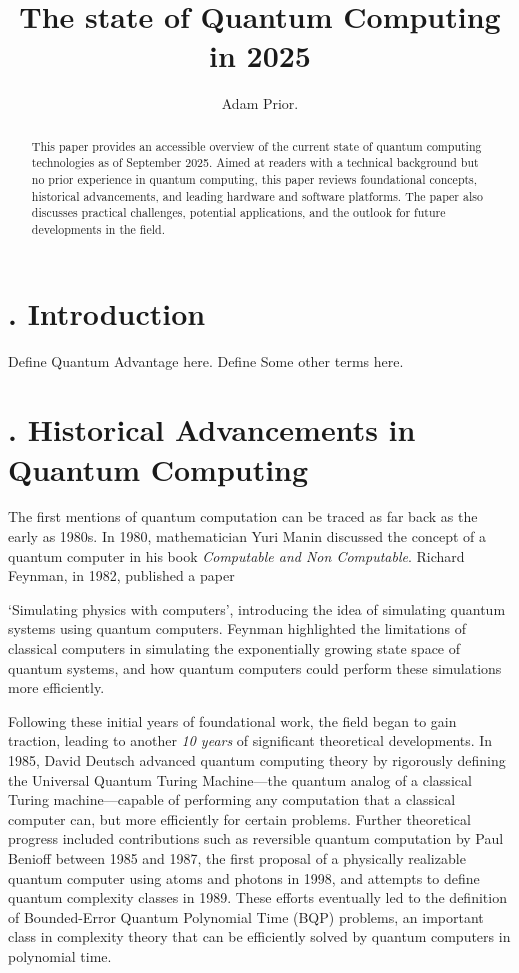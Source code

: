 \documentclass{elbioimp2}
\title{The state of Quantum Computing in 2025}
\author{Adam Prior.\affiliation{UrbanFox, Dublin, Ireland}}
\begin{document}
\setcounter{secnumdepth}{2}


\maketitle

\begin{abstract}
This paper provides an accessible overview of the current state of quantum computing technologies as of September 2025. Aimed at readers with a technical background but no prior experience in quantum computing, this paper reviews foundational concepts, historical advancements, and leading hardware and software platforms. The paper also discusses practical challenges, potential applications, and the outlook for future developments in the field.

\end{abstract}

\section{. Introduction}
Define Quantum Advantage here.
Define Some other terms here.


\section{. Historical Advancements in Quantum Computing}
The first mentions of quantum computation can be traced as far back as the early as 1980s.
In 1980, mathematician Yuri Manin discussed the concept of a quantum computer in his book \textit{Computable and Non Computable}\cite{Manin1980}. Richard Feynman, in 1982, published a paper

`Simulating physics with computers', introducing the idea of simulating quantum systems using quantum computers\cite{Feynman1982}. Feynman highlighted the limitations of classical computers in simulating the exponentially growing state space of quantum systems, and how quantum computers could perform these simulations more efficiently.


Following these initial years of foundational work, the field began to gain traction, leading to another \textit{10 years} of significant theoretical developments. In 1985, David Deutsch advanced quantum computing theory by rigorously defining the Universal Quantum Turing Machine—the quantum analog of a classical Turing machine—capable of performing any computation that a classical computer can, but more efficiently for certain problems\cite{Deutsch1985}.
Further theoretical progress included contributions such as reversible quantum computation by Paul Benioff between 1985 and 1987\cite{benioff1986}, the first proposal of a physically realizable quantum computer using atoms and photons in 1998\cite{Igeta:88}, and attempts to define quantum complexity classes in 1989\cite{10.1145/167088.167097}. These efforts eventually led to the definition of Bounded-Error Quantum Polynomial Time (BQP) problems, an important class in complexity theory that can be efficiently solved by quantum computers in polynomial time.
\end{document}
